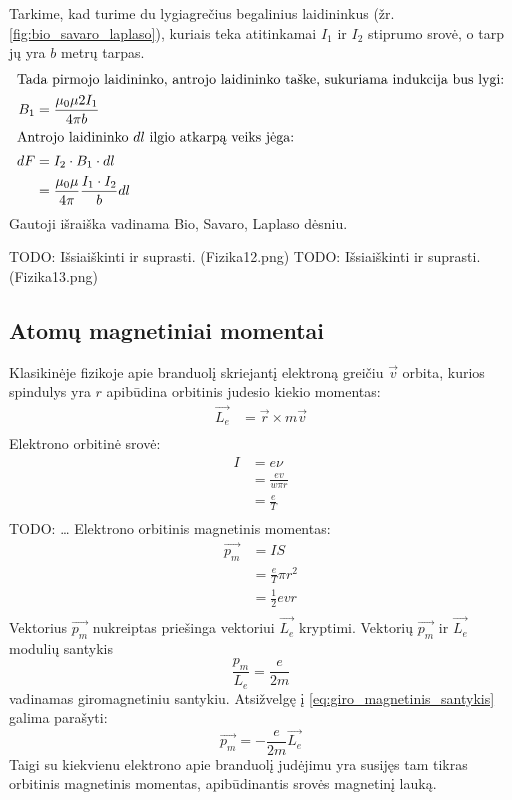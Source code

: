 \begin{defn}
  Tarkime, kad turime du lygiagrečius begalinius laidininkus (žr.
  \ref{fig:bio_savaro_laplaso}), kuriais teka atitinkamai $I_{1}$
  ir $I_{2}$ stiprumo srovė, o tarp jų yra $b$ metrų tarpas.
  \begin{align*}
    \intertext{Tada pirmojo laidininko, antrojo laidininko taške,
    sukuriama indukcija bus lygi:}
    B_{1} &= \frac{\mu_{0}\mu 2 I_{1}}{4 \pi b} \\
    \intertext{Antrojo laidininko $dl$ ilgio atkarpą veiks jėga:}
    dF
    &= I_{2} \cdot B_{1} \cdot dl \\
    &= \frac{\mu_{0}\mu}{4 \pi} \frac{I_{1}\cdot I_{2}}{b} dl \\
  \end{align*}
  Gautoji išraiška vadinama Bio, Savaro, Laplaso dėsniu.
\end{defn}

TODO: Išsiaiškinti ir suprasti. (Fizika12.png)
TODO: Išsiaiškinti ir suprasti. (Fizika13.png)

\subsection{Atomų magnetiniai momentai}

Klasikinėje fizikoje apie branduolį skriejantį elektroną greičiu
$\vec{v}$ orbita, kurios spindulys yra $r$ apibūdina orbitinis judesio
kiekio momentas:
\begin{align*}
  \vec{L_{e}} &= \vec{r} \times m \vec{v} \\
\end{align*}
Elektrono orbitinė srovė:
\begin{align*}
  I
  &= e \nu \\
  &= \frac{e v}{w \pi r} \\
  &= \frac{e}{T} \\
\end{align*}
TODO: …
Elektrono orbitinis magnetinis momentas:
\begin{align*}
  \vec{p_{m}}
  &= I S \\
  &= \frac{e}{T} \pi r^{2} \\
  &= \frac{1}{2} e v r \\
\end{align*}
Vektorius $\vec{p_{m}}$ nukreiptas priešinga vektoriui $\vec{L_{e}}$
kryptimi. Vektorių $\vec{p_{m}}$ ir $\vec{L_{e}}$ modulių santykis
\begin{equation}
  \frac{p_{m}}{L_{e}} = \frac{e}{2m}
  \label{eq:giro_magnetinis_santykis}
\end{equation}
vadinamas giromagnetiniu santykiu. Atsižvelgę į
\ref{eq:giro_magnetinis_santykis} galima parašyti:
\begin{equation*}
  \vec{p_{m}} = - \frac{e}{2m} \vec{L_{e}}
\end{equation*}
Taigi su kiekvienu elektrono apie branduolį judėjimu yra susijęs tam
tikras orbitinis magnetinis momentas, apibūdinantis srovės magnetinį
lauką.

